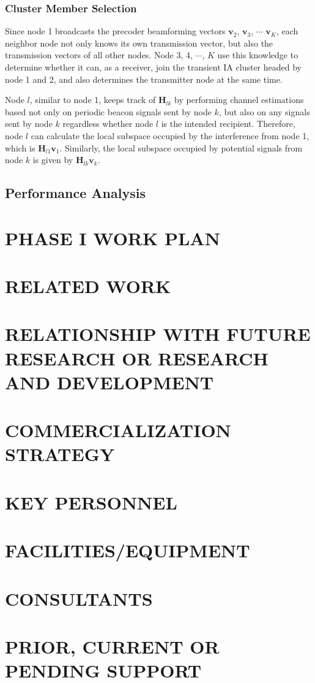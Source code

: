 \documentclass[letterpaper,11pt]{article}
\begin{document}
\subsubsection{Cluster Member Selection}
 
Since node 1 broadcasts the precoder beamforming vectors  $\boldsymbol{v}_2$, $\boldsymbol{v}_3$, $\cdots$ $\boldsymbol{v}_K$, each neighbor node not only knows its own transmission vector, but also the transmission vectors of all other nodes. Node 3, 4, $\cdots$, $K$ use this knowledge to determine whether it can, as a receiver, join the transient IA cluster headed by node 1 and 2, and also determines the transmitter node at the same time. 

Node $l$, similar to node 1, keeps track of $\boldsymbol{H}_{lk}$ by performing channel estimations based not only on periodic beacon signals sent by node $k$, but also on any signals sent by node $k$ regardless whether node $l$ is the intended recipient. Therefore, node $l$ can calculate the local subspace occupied by the interference from node 1, which is $\boldsymbol{H}_{l1}\boldsymbol{v}_{1}$.  Similarly, the local subspace occupied by potential signals from node $k$ is given by $\boldsymbol{H}_{lk}\boldsymbol{v}_{k}$.
 

\subsection{Performance Analysis}


\section{PHASE I WORK PLAN}

\section{RELATED WORK}

\section{RELATIONSHIP WITH FUTURE RESEARCH OR RESEARCH AND DEVELOPMENT}

\section{COMMERCIALIZATION STRATEGY}

\section{KEY PERSONNEL}

\section{FACILITIES/EQUIPMENT}

\section{CONSULTANTS}

\section{PRIOR, CURRENT OR PENDING SUPPORT}



\end{document}
